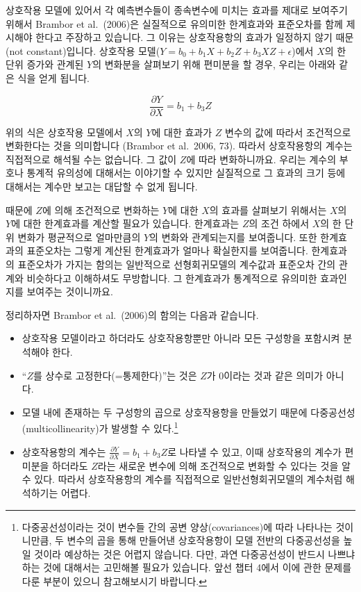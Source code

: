 \documentclass[
]{book}
\begin{document}
상호작용 모델에 있어서 각 예측변수들이 종속변수에 미치는 효과를 제대로 보여주기 위해서 Brambor et al.~(2006)은 실질적으로 유의미한 한계효과와 표준오차를 함께 제시해야 한다고 주장하고 있습니다. 그 이유는 상호작용항의 효과가 일정하지 않기 때문(not constant)입니다. 상호작용 모델(\(Y = b_0 + b_1X + b_2Z + b_3XZ + \epsilon\))에서 \(X\)의 한 단위 증가와 관계된 \(Y\)의 변화분을 살펴보기 위해 편미분을 할 경우, 우리는 아래와 같은 식을 얻게 됩니다.

\[
\frac{\partial Y}{\partial X} = b_1+ b_3 Z
\]

위의 식은 상호작용 모델에서 \(X\)의 \(Y\)에 대한 효과가 \(Z\) 변수의 값에 따라서 조건적으로 변화한다는 것을 의미합니다 (Brambor et al.~2006, 73). 따라서 상호작용항의 계수는 직접적으로 해석될 수는 없습니다. 그 값이 \(Z\)에 따라 변화하니까요. 우리는 계수의 부호나 통계적 유의성에 대해서는 이야기할 수 있지만 실질적으로 그 효과의 크기 등에 대해서는 계수만 보고는 대답할 수 없게 됩니다.

때문에 \(Z\)에 의해 조건적으로 변화하는 \(Y\)에 대한 \(X\)의 효과를 살펴보기 위해서는 \(X\)의 \(Y\)에 대한 한계효과를 계산할 필요가 있습니다. 한계효과는 \(Z\)의 조건 하에서 \(X\)의 한 단위 변화가 평균적으로 얼마만큼의 \(Y\)의 변화와 관계되는지를 보여줍니다. 또한 한계효과의 표준오차는 그렇게 계산된 한계효과가 얼마나 확실한지를 보여줍니다. 한계효과의 표준오차가 가지는 함의는 일반적으로 선형회귀모델의 계수값과 표준오차 간의 관계와 비슷하다고 이해하셔도 무방합니다. 그 한계효과가 통계적으로 유의미한 효과인지를 보여주는 것이니까요.

정리하자면 Brambor et al.~(2006)의 함의는 다음과 같습니다.

\begin{itemize}
\item
  상호작용 모델이라고 하더라도 상호작용항뿐만 아니라 모든 구성항을 포함시켜 분석해야 한다.
\item
  ``\(Z\)를 상수로 고정한다(=통제한다)''는 것은 \(Z\)가 0이라는 것과 같은 의미가 아니다.
\item
  모델 내에 존재하는 두 구성항의 곱으로 상호작용항을 만들었기 때문에 다중공선성(multicollinearity)가 발생할 수 있다.\footnote{다중공선성이라는 것이 변수들 간의 공변 양상(covariances)에 따라 나타나는 것이니만큼, 두 변수의 곱을 통해 만들어낸 상호작용항이 모델 전반의 다중공선성을 높일 것이라 예상하는 것은 어렵지 않습니다. 다만, 과연 다중공선성이 반드시 나쁘냐하는 것에 대해서는 고민해볼 필요가 있습니다. 앞선 챕터 4에서 이에 관한 문제를 다룬 부분이 있으니 참고해보시기 바랍니다.}
\item
  상호작용항의 계수는 \(\frac{\partial Y}{\partial X} = b_1+ b_3 Z\)로 나타낼 수 있고, 이때 상호작용의 계수가 편미분을 하더라도 \(Z\)라는 새로운 변수에 의해 조건적으로 변화할 수 있다는 것을 알 수 있다. 따라서 상호작용항의 계수를 직접적으로 일반선형회귀모델의 계수처럼 해석하기는 어렵다.
\end{itemize}
\end{document}
